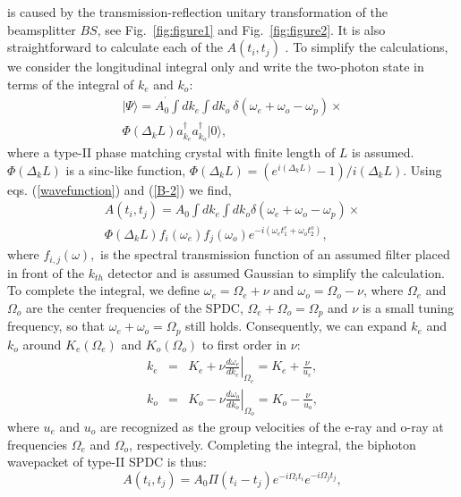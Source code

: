 \documentclass[pra,aps,epsf,12pt]{revtex4-2}
\begin{document}
is caused by the transmission-reflection unitary transformation of the beamsplitter $BS$,
see Fig.~\ref{fig:figure1} and Fig.~\ref{fig:figure2}. It is also straightforward to
calculate each of the $A(t_{i}, t_{j})$ \cite{function}. To simplify the calculations, we
consider the longitudinal integral only and write the two-photon state in terms of the
integral of $k_{e}$ and $k_{o}$:
\begin{eqnarray}
| \Psi \rangle =A_{0}^{^{\prime}}\int dk_{e}\int dk_{o}\
\delta(\omega_{e}+\omega_{o}-\omega_{p}) \times \nonumber \\ \Phi(\Delta_{k}L)
a_{k_{e}}^{\dagger}a_{k_{o}}^{\dagger}|0\rangle ,  \label{B-2}
\end{eqnarray}
where a type-II phase matching crystal with finite length of $L$ is assumed.
$\Phi(\Delta_{k}L)$ is a sinc-like function,
$\Phi(\Delta_{k}L)=(e^{i(\Delta_{k}L)}-1)/i(\Delta_{k}L)$. Using eqs.
(\ref{wavefunction}) and (\ref{B-2}) we find,
\begin{eqnarray}
A(t_{i}, t_{j})=A_{0}\int dk_{e}\int dk_{o} \delta(\omega_{e}+\omega_{o}-\omega_{p})
\times \nonumber \\
\Phi(\Delta_{k}L) f_{i}(\omega_{e})f_{j}(\omega_{o})
e^{-i(\omega_{e}t_{1}^{e}+\omega_{o}t_{2}^{o})} , \label{B-5}
\end{eqnarray}
where $f_{i,j}(\omega ),$ is the spectral transmission function of an assumed filter
placed in front of the $k_{th}$ detector and is assumed Gaussian to simplify the
calculation. To complete the integral, we define $\omega_{e}=\Omega_{e}+\nu$ and
$\omega_{o}=\Omega_{o}-\nu$, where $\Omega_{e}$ and $\Omega_{o}$ are the center
frequencies of the SPDC, $\Omega_{e}+\Omega_{o}=\Omega_{p}$ and $\nu$ is a small tuning
frequency, so that $\omega_{e}+\omega_{o}=\Omega_{p}$ still holds. Consequently, we can
expand $k_{e}$ and $k_{o}$ around $K_{e}(\Omega_{e})$ and $K_{o}(\Omega_{o})$ to first
order in $\nu$:
\begin{eqnarray}
k_{e} &=& K_{e}+\nu \left.\frac{d\omega_{e}}{dk_{e}}\right|_{\Omega_{e}} = K_{e}+%
\frac{\nu}{u_{e}} , \nonumber \\ k_{o} &=& K_{o}-\nu
\left.\frac{d\omega_{o}}{dk_{o}}\right|_{\Omega_{o}} = K_{o}-\frac{\nu}{u_{o}} ,
\label{B-6}
\end{eqnarray}
where $u_{e}$ and $u_{o}$ are recognized as the group velocities of the e-ray and o-ray
at frequencies $\Omega_{e}$ and $\Omega_{o}$, respectively. Completing the integral, the
biphoton wavepacket of type-II SPDC is thus:
\begin{equation}
A(t_{i}, t_{j})=A_{0} \Pi(t_{i}-t_{j}) e^{-i\Omega_{i}t_{i}} e^{-i\Omega_{j}t_{j}} ,
\label{B-14}
\end{equation}
\end{document}
